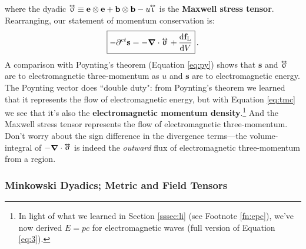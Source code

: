 \documentclass[12pt]{article}
\renewcommand{\vv}[1]{\mathbf{#1}}
\newcommand{\dd}[1]{\mathrm{d}#1}
\newcommand{\del}{\boldsymbol{\nabla}}
\newcommand{\tightoverset}[2]{%
  \mathop{#2}\limits^{\vbox to -.5ex{\kern-0.75ex\hbox{$#1$}\vss}}}
\newcommand{\inlinedy}[1]{\tightoverset{\text{\tiny$\bm\leftrightarrow$}}{#1}}
\begin{document}
where the dyadic $\inlinedy{\upsigma} \equiv \vv e \otimes \vv e + \vv b \otimes \vv b - u \mkern-4.5mu \inlinedy{\upiota}$ is the \textbf{Maxwell stress tensor}. Rearranging, our statement of momentum conservation is:
\begin{equation}\label{eq:tmc}
\boxed{ - \partial^{ct} \vv s = - \del \cdot \inlinedy{\upsigma} \, + \, \dfrac{\dd \vv f_{\mathrm{L}}}{\dd V} } \, .
\end{equation}
A comparison with Poynting's theorem (Equation \ref{eq:py}) shows that $\vv s$ and $\inlinedy{\upsigma}$ are to electromagnetic three-momentum as $u$ and $\vv s$ are to electromagnetic energy. The Poynting vector does ``double duty": from Poynting's theorem we learned that it represents the flow of electromagnetic energy, but with Equation \ref{eq:tmc} we see that it's also the \textbf{electromagnetic momentum density}.\footnote{In light of what we learned in Section \ref{sssec:li} (see Footnote \ref{fn:epc}), we've now derived $E = pc$ for electromagnetic waves (full version of Equation \ref{eq:3}).} And the Maxwell stress tensor represents the flow of electromagnetic three-momentum. Don't worry about the sign difference in the divergence terms---the volume-integral of $- \del \cdot \inlinedy{\upsigma}$ is indeed the \emph{outward} flux of electromagnetic three-momentum from a region.


\subsubsection{Minkowski Dyadics; Metric and Field Tensors}\label{sssec:md}
\end{document}
